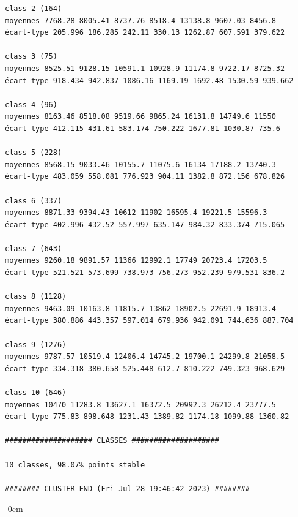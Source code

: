 \documentclass[land,article,submit,pdftex,moreauthors]{Definitions/mdpi}
\begin{document}
\begin{scriptsize}
\begin{verbatim}
class 2 (164)
moyennes 7768.28 8005.41 8737.76 8518.4 13138.8 9607.03 8456.8
écart-type 205.996 186.285 242.11 330.13 1262.87 607.591 379.622

class 3 (75)
moyennes 8525.51 9128.15 10591.1 10928.9 11174.8 9722.17 8725.32
écart-type 918.434 942.837 1086.16 1169.19 1692.48 1530.59 939.662

class 4 (96)
moyennes 8163.46 8518.08 9519.66 9865.24 16131.8 14749.6 11550
écart-type 412.115 431.61 583.174 750.222 1677.81 1030.87 735.6

class 5 (228)
moyennes 8568.15 9033.46 10155.7 11075.6 16134 17188.2 13740.3
écart-type 483.059 558.081 776.923 904.11 1382.8 872.156 678.826

class 6 (337)
moyennes 8871.33 9394.43 10612 11902 16595.4 19221.5 15596.3
écart-type 402.996 432.52 557.997 635.147 984.32 833.374 715.065

class 7 (643)
moyennes 9260.18 9891.57 11366 12992.1 17749 20723.4 17203.5
écart-type 521.521 573.699 738.973 756.273 952.239 979.531 836.2

class 8 (1128)
moyennes 9463.09 10163.8 11815.7 13862 18902.5 22691.9 18913.4
écart-type 380.886 443.357 597.014 679.936 942.091 744.636 887.704

class 9 (1276)
moyennes 9787.57 10519.4 12406.4 14745.2 19700.1 24299.8 21058.5
écart-type 334.318 380.658 525.448 612.7 810.222 749.323 968.629

class 10 (646)
moyennes 10470 11283.8 13627.1 16372.5 20992.3 26212.4 23777.5
écart-type 775.83 898.648 1231.43 1389.82 1174.18 1099.88 1360.82

#################### CLASSES ####################

10 classes, 98.07% points stable

######## CLUSTER END (Fri Jul 28 19:46:42 2023) ########

\end{verbatim}
\end{scriptsize}

\begin{adjustwidth}{-\extralength}{0cm}




\end{adjustwidth}
\end{document}
